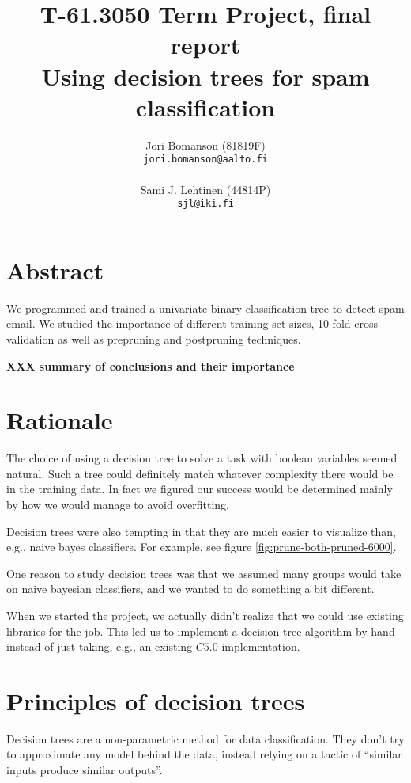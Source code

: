 \documentclass[a4paper,10pt]{article}
\title{T-61.3050 Term Project, final report\\ %
       Using decision trees for spam classification}
\author{Jori Bomanson (81819F) \\
  {\tt jori.bomanson@aalto.fi} \\
  \\
  Sami J. Lehtinen (44814P)\\ 
  {\tt sjl@iki.fi} \\
}
\newcommand{\XXX}[1]{{\bf XXX #1}}
\begin{document}

\maketitle
\thispagestyle{empty}
\pagebreak
{}

\section{Abstract}
We programmed and trained a univariate binary classification tree to detect
spam email. We studied the importance of different training set sizes,
10-fold cross validation as well as prepruning and postpruning techniques.

\XXX{summary of conclusions and their importance}


\section{Rationale}

The choice of using a decision tree to solve a task with boolean variables
seemed natural. Such a tree could definitely match whatever complexity there
would be in the training data.
In fact we figured our success would be determined mainly by how we would
manage to avoid overfitting.

Decision trees were also tempting in that they are much easier to
visualize than, e.g., naive bayes classifiers.  For example, see
figure \ref{fig:prune-both-pruned-6000}.

One reason to study decision trees was that we assumed many groups would
take on naive bayesian classifiers, and we wanted to do something a bit
different.

When we started the project, we actually didn't realize that we could
use existing libraries for the job.  This led us to implement a decision
tree algorithm by hand instead of just taking, e.g., an existing
$C5.0$\cite{c50} implementation.

\section{Principles of decision trees}

Decision trees are a non-parametric method for data classification.
They don't try to approximate any model behind the data, instead relying
on a tactic of ``similar inputs produce similar outputs''.
\end{document}
